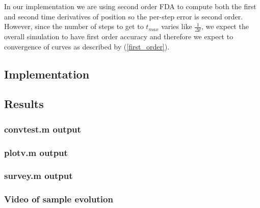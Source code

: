 \documentclass[10pt]{article}
\begin{document}
In our implementation we are using second order FDA to compute both the first and second time 
derivatives of position so the per-step error is second order. However, since the number of steps to
get to $t_{max}$ varies like $\frac{1}{\Delta t}$, we expect the overall simulation to have first order
accuracy and therefore we expect to convergence of curves as described by (\ref{first_order}).

\subsection*{Implementation}






\subsection*{Results}

\subsubsection*{convtest.m output}

\subsubsection*{plotv.m output}

\subsubsection*{survey.m output}

\subsubsection*{Video of sample evolution}
\end{document}

